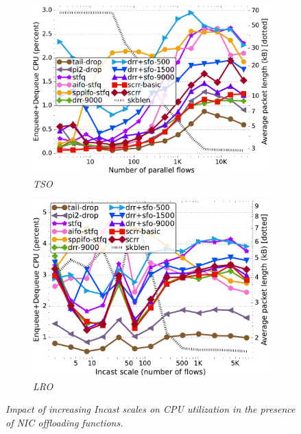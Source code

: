 \begin{figure}[t]
    \centering
	\begin{subfigure}[t]{.48\linewidth}
		\centering\includegraphics[width=0.99\linewidth]{figs/paral_cn_1t16x1024_gso_kp_skblen_comp_methods.pdf}
    \caption{\small{\textit{TSO}}}
	\label{fig:cpu-skblen-gso}

	\end{subfigure}
	\begin{subfigure}[t]{.48\linewidth}
		\centering
        \includegraphics[width=0.99\linewidth]{figs/paral_cn_1t4x1024_gro_kp_skblen_comp_methods.pdf}
    \caption{\small{\textit{LRO}}}
	\label{fig:cpu-skblen-gro}

	\end{subfigure}
 \vspace{-4mm}
    \caption{\small{\textit{Impact of increasing Incast scales on CPU utilization in the presence of NIC offloading functions.}}}
    \label{fig:cpu-skblen}
    \vspace{-4mm}
\end{figure}


